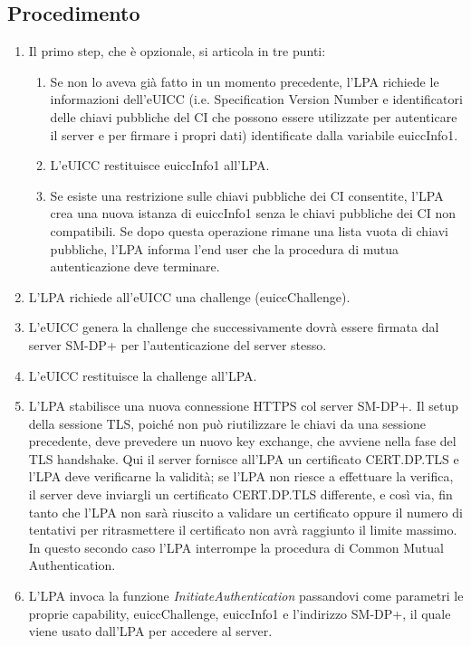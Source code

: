 \documentclass[10pt, twoside, openany]{book}
\begin{document}
\subsection{Procedimento}
\begin{enumerate}
\item Il primo step, che è opzionale, si articola in tre punti:
\begin{enumerate}[label=\alph*)]
\item Se non lo aveva già fatto in un momento precedente, l'LPA richiede le informazioni dell'eUICC (i.e. Specification Version Number e identificatori delle chiavi pubbliche del CI che possono essere utilizzate per autenticare il server e per firmare i propri dati) identificate dalla variabile euiccInfo1.
\item L'eUICC restituisce euiccInfo1 all'LPA.
\item Se esiste una restrizione sulle chiavi pubbliche dei CI consentite, l'LPA crea una nuova istanza di euiccInfo1 senza le chiavi pubbliche dei CI non compatibili. Se dopo questa operazione rimane una lista vuota di chiavi pubbliche, l'LPA informa l'end user che la procedura di mutua autenticazione deve terminare.
\end{enumerate}
\item L'LPA richiede all'eUICC una challenge (euiccChallenge).
\item L'eUICC genera la challenge che successivamente dovrà essere firmata dal server SM-DP+ per l'autenticazione del server stesso.
\item L'eUICC restituisce la challenge all'LPA.
\item L'LPA stabilisce una nuova connessione HTTPS col server SM-DP+. Il setup della sessione TLS, poiché non può riutilizzare le chiavi da una sessione precedente, deve prevedere un nuovo key exchange, che avviene nella fase del TLS handshake. Qui il server fornisce all'LPA un certificato CERT.DP.TLS e l'LPA deve verificarne la validità; se l'LPA non riesce a effettuare la verifica, il server deve inviargli un certificato CERT.DP.TLS differente, e così via, fin tanto che l'LPA non sarà riuscito a validare un certificato oppure il numero di tentativi per ritrasmettere il certificato non avrà raggiunto il limite massimo. In questo secondo caso l'LPA interrompe la procedura di Common Mutual Authentication.
\item L'LPA invoca la funzione \textit{InitiateAuthentication} passandovi come parametri le proprie capability, euiccChallenge, euiccInfo1 e l'indirizzo SM-DP+, il quale viene usato dall'LPA per accedere al server.

\end{enumerate}
\end{document}
